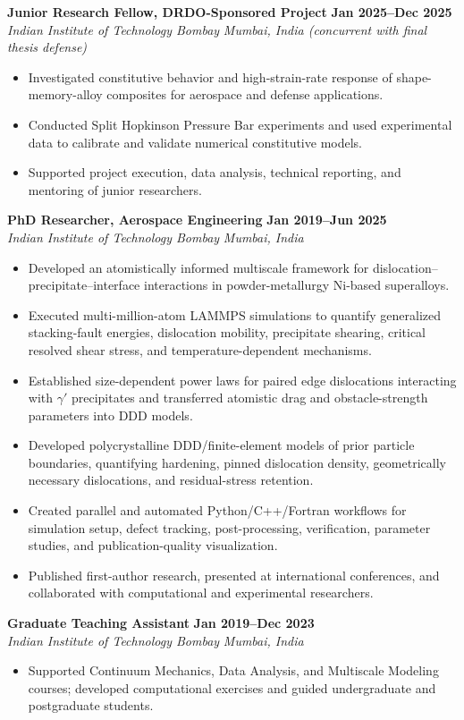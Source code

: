 \documentclass[10pt,a4paper]{article}
\newcommand{\role}[4]{%
  \textbf{#1} \hfill \textbf{#2}\\[-1pt]
  \textit{#3} \hfill \textit{#4}\vspace{1pt}
}
\begin{document}
\role{Junior Research Fellow, DRDO-Sponsored Project}{Jan 2025--Dec 2025}{Indian Institute of Technology Bombay}{Mumbai, India \normalfont\textit{(concurrent with final thesis defense)}}
\begin{itemize}
  \item Investigated constitutive behavior and high-strain-rate response of shape-memory-alloy composites for aerospace and defense applications.
  \item Conducted Split Hopkinson Pressure Bar experiments and used experimental data to calibrate and validate numerical constitutive models.
  \item Supported project execution, data analysis, technical reporting, and mentoring of junior researchers.
\end{itemize}

\role{PhD Researcher, Aerospace Engineering}{Jan 2019--Jun 2025}{Indian Institute of Technology Bombay}{Mumbai, India}
\begin{itemize}
  \item Developed an atomistically informed multiscale framework for dislocation--precipitate--interface interactions in powder-metallurgy Ni-based superalloys.
  \item Executed multi-million-atom LAMMPS simulations to quantify generalized stacking-fault energies, dislocation mobility, precipitate shearing, critical resolved shear stress, and temperature-dependent mechanisms.
  \item Established size-dependent power laws for paired edge dislocations interacting with $\gamma'$ precipitates and transferred atomistic drag and obstacle-strength parameters into DDD models.
  \item Developed polycrystalline DDD/finite-element models of prior particle boundaries, quantifying hardening, pinned dislocation density, geometrically necessary dislocations, and residual-stress retention.
  \item Created parallel and automated Python/C++/Fortran workflows for simulation setup, defect tracking, post-processing, verification, parameter studies, and publication-quality visualization.
  \item Published first-author research, presented at international conferences, and collaborated with computational and experimental researchers.
\end{itemize}

\role{Graduate Teaching Assistant}{Jan 2019--Dec 2023}{Indian Institute of Technology Bombay}{Mumbai, India}
\begin{itemize}
  \item Supported Continuum Mechanics, Data Analysis, and Multiscale Modeling courses; developed computational exercises and guided undergraduate and postgraduate students.
\end{itemize}
\end{document}
